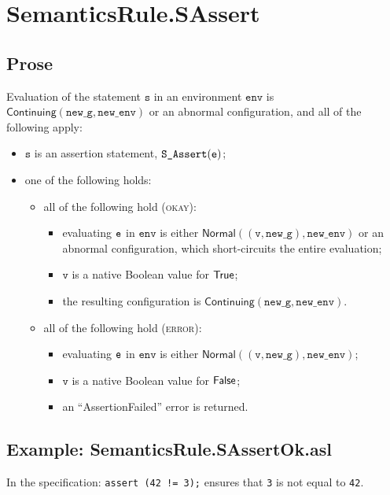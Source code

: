 \documentclass{book}
\newcommand\ProseOrAbnormal[0]{or an abnormal configuration, which short-circuits the entire evaluation}
\newcommand\Normal[0]{\textsf{Normal}}
\newcommand\Continuing[0]{\textsf{Continuing}}
\newcommand\newenv[0]{\texttt{new\_env}}
\newcommand\env[0]{\texttt{env}}
\newcommand\newg[0]{\texttt{new\_g}}
\newcommand\vv[0]{\texttt{v}}
\newcommand\vs[0]{\texttt{s}}
\begin{document}

\section{SemanticsRule.SAssert \label{sec:SemanticsRule.SAssert}}
    \subsection{Prose}
    Evaluation of the statement $\vs$ in an environment $\env$ is
    $\Continuing(\newg, \newenv)$ or an abnormal configuration,
    and all of the following apply:
    \begin{itemize}
      \item $\vs$ is an assertion statement, $\texttt{S\_Assert}(\texttt{e})$;
      \item one of the following holds:
      \begin{itemize}
        \item all of the following hold (\textsc{okay}):
        \begin{itemize}
          \item evaluating $\texttt{e}$ in $\env$ is either $\Normal((\vv, \newg), \newenv)$
          \ProseOrAbnormal;
          \item $\vv$ is a native Boolean value for $\textsf{True}$;
          \item the resulting configuration is $\Continuing(\newg, \newenv)$.
        \end{itemize}

        \item all of the following hold (\textsc{error}):
        \begin{itemize}
          \item evaluating $\texttt{e}$ in $\env$ is either $\Normal((\vv, \newg), \newenv)$;
          \item $\vv$ is a native Boolean value for $\textsf{False}$;
          \item an ``AssertionFailed'' error is returned.
        \end{itemize}
      \end{itemize}
    \end{itemize}

    \subsection{Example: SemanticsRule.SAssertOk.asl}
    In the specification:
    \texttt{assert (42 != 3);} ensures that \texttt{3} is not equal to \texttt{42}.
\end{document}
